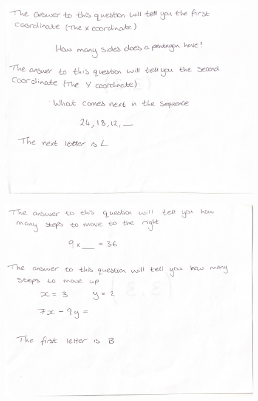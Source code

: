 \documentclass[11pt, a4paper, notitlepage]{article}
\begin{document}
\begin{figure}[htbp]
    \centering
    \includegraphics[width=\textwidth]{Images/CoordinateGrid_questions-pages-3.pdf}
\end{figure}
\begin{figure}[htbp]
    \centering
    \includegraphics[width=\textwidth]{Images/CoordinateGrid_questions-pages-4.pdf}
\end{figure}
\end{document}
